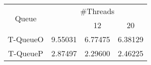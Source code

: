 \begin{tabular}{|c|c|c|c|}
\hline
\multirow{2}{*}{Queue} & \multicolumn{3}{c|}{\#Threads}\\\cline{2-4}& \quad 4 & 12 & 20\\
\hline
\hline
T-QueueO & 9.55031 & 6.77475 & 6.38129\\
T-QueueP & 2.87497 & 2.29600 & 2.46225\\
\hline\end{tabular}
